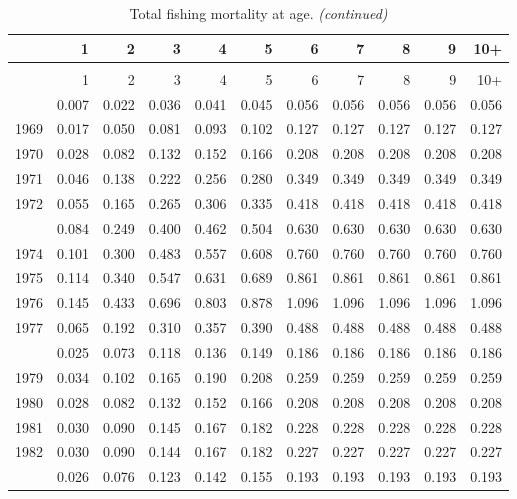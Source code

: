 \documentclass[
]{article}
\begin{document}
\begin{longtable}[t]{lrrrrrrrrrr}
\caption{\label{tab:FAA-tot-table}Total fishing mortality at age.}\\
\toprule
  & 1 & 2 & 3 & 4 & 5 & 6 & 7 & 8 & 9 & 10+\\
\midrule
\endfirsthead
\caption[]{Total fishing mortality at age. \textit{(continued)}}\\
\toprule
  & 1 & 2 & 3 & 4 & 5 & 6 & 7 & 8 & 9 & 10+\\
\midrule
\endhead

\endfoot
\bottomrule
\endlastfoot
1968 & 0.007 & 0.022 & 0.036 & 0.041 & 0.045 & 0.056 & 0.056 & 0.056 & 0.056 & 0.056\\
1969 & 0.017 & 0.050 & 0.081 & 0.093 & 0.102 & 0.127 & 0.127 & 0.127 & 0.127 & 0.127\\
1970 & 0.028 & 0.082 & 0.132 & 0.152 & 0.166 & 0.208 & 0.208 & 0.208 & 0.208 & 0.208\\
1971 & 0.046 & 0.138 & 0.222 & 0.256 & 0.280 & 0.349 & 0.349 & 0.349 & 0.349 & 0.349\\
1972 & 0.055 & 0.165 & 0.265 & 0.306 & 0.335 & 0.418 & 0.418 & 0.418 & 0.418 & 0.418\\
\addlinespace
1973 & 0.084 & 0.249 & 0.400 & 0.462 & 0.504 & 0.630 & 0.630 & 0.630 & 0.630 & 0.630\\
1974 & 0.101 & 0.300 & 0.483 & 0.557 & 0.608 & 0.760 & 0.760 & 0.760 & 0.760 & 0.760\\
1975 & 0.114 & 0.340 & 0.547 & 0.631 & 0.689 & 0.861 & 0.861 & 0.861 & 0.861 & 0.861\\
1976 & 0.145 & 0.433 & 0.696 & 0.803 & 0.878 & 1.096 & 1.096 & 1.096 & 1.096 & 1.096\\
1977 & 0.065 & 0.192 & 0.310 & 0.357 & 0.390 & 0.488 & 0.488 & 0.488 & 0.488 & 0.488\\
\addlinespace
1978 & 0.025 & 0.073 & 0.118 & 0.136 & 0.149 & 0.186 & 0.186 & 0.186 & 0.186 & 0.186\\
1979 & 0.034 & 0.102 & 0.165 & 0.190 & 0.208 & 0.259 & 0.259 & 0.259 & 0.259 & 0.259\\
1980 & 0.028 & 0.082 & 0.132 & 0.152 & 0.166 & 0.208 & 0.208 & 0.208 & 0.208 & 0.208\\
1981 & 0.030 & 0.090 & 0.145 & 0.167 & 0.182 & 0.228 & 0.228 & 0.228 & 0.228 & 0.228\\
1982 & 0.030 & 0.090 & 0.144 & 0.167 & 0.182 & 0.227 & 0.227 & 0.227 & 0.227 & 0.227\\
\addlinespace
1983 & 0.026 & 0.076 & 0.123 & 0.142 & 0.155 & 0.193 & 0.193 & 0.193 & 0.193 & 0.193\\

\end{longtable}
\end{document}
